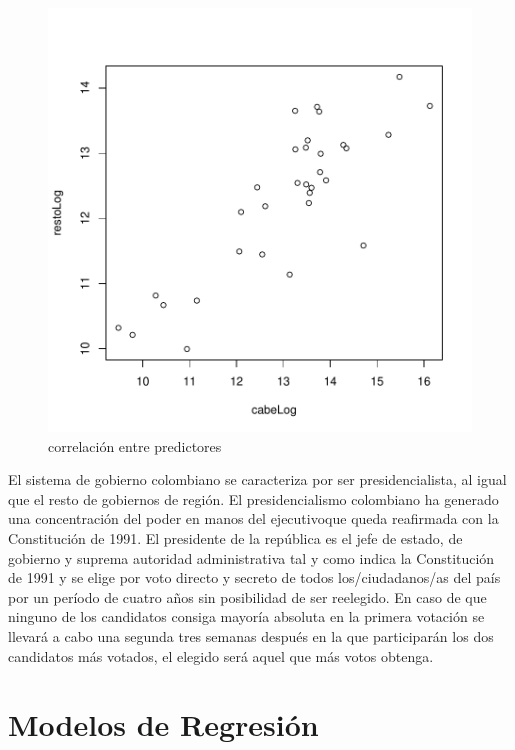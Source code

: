 \documentclass{article}
\begin{document}
\begin{figure}[h]
\centering
\begin{adjustbox}{width=10cm,height=7cm}
\includegraphics{proyecto1-corrPlotX}
\end{adjustbox}
\caption{correlación entre predictores}
\label{corrPlotX}
\end{figure}
 El sistema de gobierno colombiano se caracteriza por ser presidencialista, al igual que el resto de gobiernos de región. El presidencialismo colombiano ha generado una concentración del poder en manos del ejecutivoque queda reafirmada con la Constitución de 1991. El presidente de la república es el jefe de estado, de gobierno y suprema autoridad administrativa tal y como indica la Constitución de 1991 y se elige por voto directo y secreto de todos los/ciudadanos/as del país por un período de cuatro años sin posibilidad de ser reelegido. En caso de que ninguno de los candidatos consiga mayoría absoluta en la primera votación se llevará a cabo una segunda tres semanas después en la que participarán los dos candidatos más votados, el elegido será aquel que más votos obtenga. 
\section{Modelos de Regresión}
\end{document}
